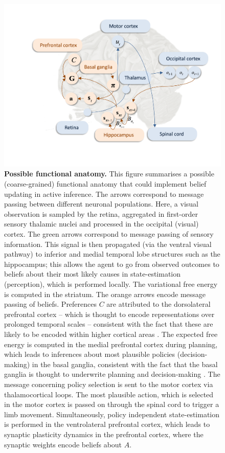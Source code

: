 \documentclass{article}
\begin{document}
\begin{figure}
    \centering
    \includegraphics[width=\textwidth]{FigureBrain.png}
    \caption{\textbf{Possible functional anatomy.} This figure summarises a possible (coarse-grained) functional anatomy that could implement belief updating in active inference. The arrows correspond to message passing between different neuronal populations. Here, a visual observation is sampled by the retina, aggregated in first-order sensory thalamic nuclei and processed in the occipital (visual) cortex. The green arrows correspond to message passing of sensory information. This signal is then propagated (via the ventral visual pathway) to inferior and medial temporal lobe structures such as the hippocampus; this allows the agent to go from observed outcomes to beliefs about their most likely causes in state-estimation (perception), which is performed locally. The variational free energy is computed in the striatum. The orange arrows encode message passing of beliefs. Preferences $C$ are attributed to the dorsolateral prefrontal cortex – which is thought to encode representations over prolonged temporal scales \cite{parrWorkingMemoryAttention2017} – consistent with the fact that these are likely to be encoded within higher cortical areas \cite{fristonActiveInferenceCuriosity2017}. The expected free energy is computed in the medial prefrontal cortex \cite{fristonActiveInferenceProcess2017} during planning, which leads to inferences about most plausible policies (decision-making) in the basal ganglia, consistent with the fact that the basal ganglia is thought to underwrite planning and decision-making \cite{parrAnatomyInferenceGenerative2018,jahanshahiFrontostriatosubthalamicpallidalNetworkGoaldirected2015,bernsHowBasalGanglia1996,dingBasalGangliaContributions2013,haberPrimateBasalGanglia2003,thibautBasalGangliaPlay2016}. The message concerning policy selection is sent to the motor cortex via thalamocortical loops. The most plausible action, which is selected in the motor cortex is passed on through the spinal cord to trigger a limb movement. Simultaneously, policy independent state-estimation is performed in the ventrolateral prefrontal cortex, which leads to synaptic plasticity dynamics in the prefrontal cortex, where the synaptic weights encode beliefs about $A$.}
    \label{fig: brain}
\end{figure}
\end{document}
